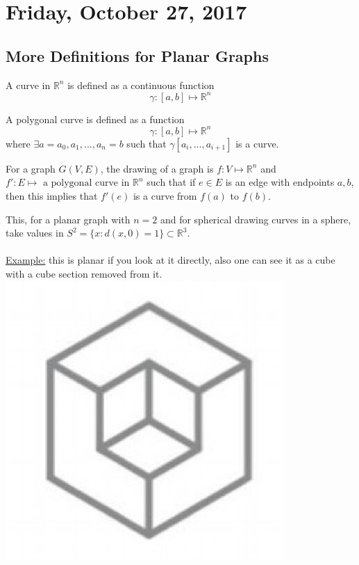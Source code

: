 \documentclass[12pt]{article}
\begin{document}
\newpage

\section{Friday, October 27, 2017}

\subsection{More Definitions for Planar Graphs}

\begin{tcolorbox}[title=Curve in $\mathbb{R}^n$]
	A curve in $\mathbb{R}^n$ is defined as a continuous function $$\gamma : [a,b] \mapsto \mathbb{R}^n$$
\end{tcolorbox}

\begin{tcolorbox}[title=Polygonal Curve]
	A polygonal curve is defined as a function
	$$\gamma : [a,b] \mapsto \mathbb{R}^n$$
	where $\exists a=a_0, a_1,..., a_n = b$ such that $\gamma [a_i,..., a_{i+1}]$ is a curve. 
\end{tcolorbox}

\begin{tcolorbox}[title=Drawing of a Graph]
	For a graph $G(V,E)$, the drawing of a graph is $f : V \mapsto \mathbb{R}^n$ and $f' : E\mapsto\text{ a polygonal curve in $\mathbb{R}^n$}$ such that if $e\in E$ is an edge with endpoints $a,b$, then this implies that $f'(e)$ is a curve from $f(a)$ to $f(b)$.
\end{tcolorbox}

This, for a planar graph with $n=2$ and for spherical drawing curves in a sphere, take values in $S^2 = \{ x : d(x,0)=1 \} \subset \mathbb{R}^3$.\\
\\
\underline{Example:} this is planar if you look at it directly, also one can see it as a cube with a cube section removed from it.\\
\includegraphics[scale=0.25]{lec12}
\end{document}
